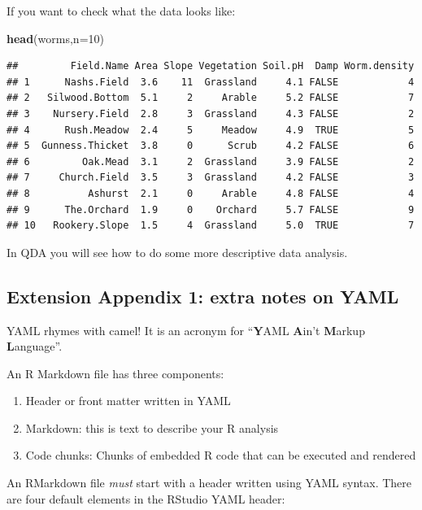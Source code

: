 \documentclass[
]{article}
\newenvironment{Shaded}{\begin{snugshade}}{\end{snugshade}}
\newcommand{\AttributeTok}[1]{\textcolor[rgb]{0.13,0.29,0.53}{#1}}
\newcommand{\DecValTok}[1]{\textcolor[rgb]{0.00,0.00,0.81}{#1}}
\newcommand{\FunctionTok}[1]{\textcolor[rgb]{0.13,0.29,0.53}{\textbf{#1}}}
\newcommand{\NormalTok}[1]{#1}
\providecommand{\tightlist}{%
  \setlength{\itemsep}{0pt}\setlength{\parskip}{0pt}}
\begin{document}
If you want to check what the data looks like:

\begin{Shaded}
\begin{Highlighting}[]
\FunctionTok{head}\NormalTok{(worms,}\AttributeTok{n=}\DecValTok{10}\NormalTok{)}
\end{Highlighting}
\end{Shaded}

\begin{verbatim}
##         Field.Name Area Slope Vegetation Soil.pH  Damp Worm.density
## 1      Nashs.Field  3.6    11  Grassland     4.1 FALSE            4
## 2   Silwood.Bottom  5.1     2     Arable     5.2 FALSE            7
## 3    Nursery.Field  2.8     3  Grassland     4.3 FALSE            2
## 4      Rush.Meadow  2.4     5     Meadow     4.9  TRUE            5
## 5  Gunness.Thicket  3.8     0      Scrub     4.2 FALSE            6
## 6         Oak.Mead  3.1     2  Grassland     3.9 FALSE            2
## 7     Church.Field  3.5     3  Grassland     4.2 FALSE            3
## 8          Ashurst  2.1     0     Arable     4.8 FALSE            4
## 9      The.Orchard  1.9     0    Orchard     5.7 FALSE            9
## 10   Rookery.Slope  1.5     4  Grassland     5.0  TRUE            7
\end{verbatim}

In QDA you will see how to do some more descriptive data analysis.

\subsection{Extension Appendix 1: extra notes on
YAML}\label{YAML_appendix}

YAML rhymes with camel! It is an acronym for ``\textbf{Y}AML
\textbf{A}in't \textbf{M}arkup \textbf{L}anguage''.

An R Markdown file has three components:

\begin{enumerate}
\def\labelenumi{\arabic{enumi}.}
\tightlist
\item
  Header or front matter written in YAML
\item
  Markdown: this is text to describe your R analysis
\item
  Code chunks: Chunks of embedded R code that can be executed and
  rendered
\end{enumerate}

An RMarkdown file \emph{must} start with a header written using YAML
syntax. There are four default elements in the RStudio YAML header:
\end{document}
